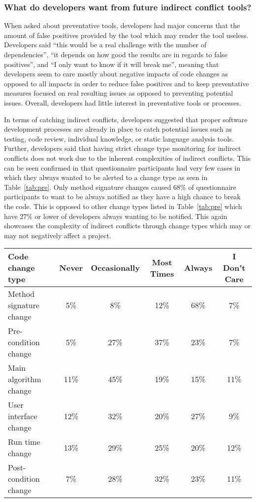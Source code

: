 \subsubsection{What do developers want from future indirect conflict tools?}

When asked about preventative tools, developers had major concerns that the amount of false positives
provided by the tool which may render the tool useless. Developers said ``this would
be a real challenge with the number of dependencies'', ``it depends on how
good the results are in regards to false positives'', and ``I only want to know if it will break me'', meaning that
developers seem to care mostly about negative impacts of code changes as opposed to all impacts in order to reduce
false positives and to keep preventative measures focused on real resulting issues as opposed to preventing potential
issues. Overall, developers had little interest in preventative tools or processes.

In terms of catching indirect conflicts, developers suggested that proper software development processes
are already in place to catch potential issues such as testing, code review,
individual knowledge, or static language analysis tools. Further, developers said that having strict change type monitoring
for indirect conflicts does not work due to the inherent complexities of indirect conflicts.
This can be seen confirmed in that questionnaire participants had very few cases in which they always wanted to be
alerted to a change type as seen in Table~\ref{tab:pre}. Only method signature changes caused 68\% of questionnaire participants
to want to be always notified as they have a high chance to break the code. This is opposed to other change types listed in
Table~\ref{tab:pre} which have 27\% or lower of developers always wanting to be notified. This again showcases the
complexity of indirect conflicts through change types which may or may not negatively affect a project.

\begin{table*}[tb!]
\begin{center}
\begin{tabular}{| p{3cm} | c | c | c | c | c |}
\hline
Code change type &Never  & Occasionally & Most Times & Always & I Don't Care \\
\hline
\hline
Method signature change & 5\% & 8\% & 12\% & 68\% & 7\% \\ \hline
Pre-condition change & 5\% & 27\% & 37\% & 23\% & 7\% \\ \hline
Main algorithm change & 11\% & 45\% & 19\% & 15\% & 11\% \\ \hline
User interface change & 12\% & 32\% & 20\% & 27\% & 9\% \\ \hline
Run time change & 13\% & 29\% & 25\% & 20\% & 12\% \\ \hline
Post-condition change & 7\% & 28\% & 32\% & 23\% & 11\% \\ \hline
\end{tabular}
\end{center}
\caption{Questionnaire results about source code changes that developers deem notification worthy, in terms of percentage
of questionnaire participants.\label{tab:pre}}
\end{table*}

